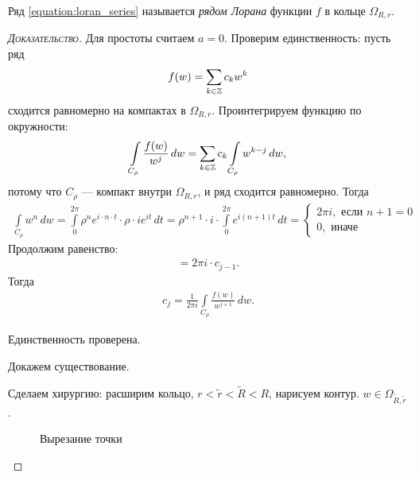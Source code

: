 \documentclass[../../main.tex]{subfiles}
\begin{document}
\begin{df}
 Ряд \eqref{equation:loran_series} называется \textit{рядом Лорана} функции $ f $ в кольце $ \Omega_{R,r} $.
\end{df}
\begin{proof}[\normalfont\textsc{Доказательство}]
 Для простоты считаем $ a = 0 $. Проверим единственность: пусть ряд
 \begin{align*}
  f(w) = \sum_{k \in \mathbb{Z}}c_k w^{k}
 \end{align*} сходится равномерно на компактах в $ \Omega_{R,r} $. Проинтегрируем функцию по окружности:
 \begin{align*}
  \int\limits_{C_\rho} \frac{f(w)}{w^{j}} \,dw = \sum_{k \in \mathbb{Z}} c_k \int\limits_{C_\rho} w^{k-j}\,dw,
 \end{align*} потому что $ C_\rho $ --- компакт внутри $ \Omega_{R,r} $, и ряд сходится равномерно. Тогда
 \begin{align*}
  \int\limits_{C_\rho} w^{n}  \, dw = \int\limits_{0}^{2\pi}  \rho^{n} e^{i \cdot n \cdot t} \cdot \rho \cdot i e^{it}\,dt = \rho^{n+1} \cdot i \cdot \int\limits_{0}^{2\pi} e^{i(n+1)t}\,dt = \begin{cases}
   2\pi i, \text{ если } n+1=0 \\
   0, \text{ иначе }
  \end{cases} 
 \end{align*} Продолжим равенство:
 \begin{align*}
  = 2\pi i \cdot c_{j-1}.
 \end{align*} Тогда
 \begin{align*}
  c_j = \frac{1}{2\pi i} \int\limits_{C_\rho}   \frac{f(w)}{w^{j+1}}\,dw.
 \end{align*}

 Единственность проверена.

 Докажем существование.

 Сделаем хирургию: расширим кольцо, $ r < \tilde r < \tilde R < R $, нарисуем контур. $ w \in \Omega_{\tilde R, \tilde r} $.

\begin{figure}[ht]
    \centering
    \caption{Вырезание точки}
    \label{fig:laurent-series-point-surgery}
\end{figure}


\end{proof}
\end{document}
